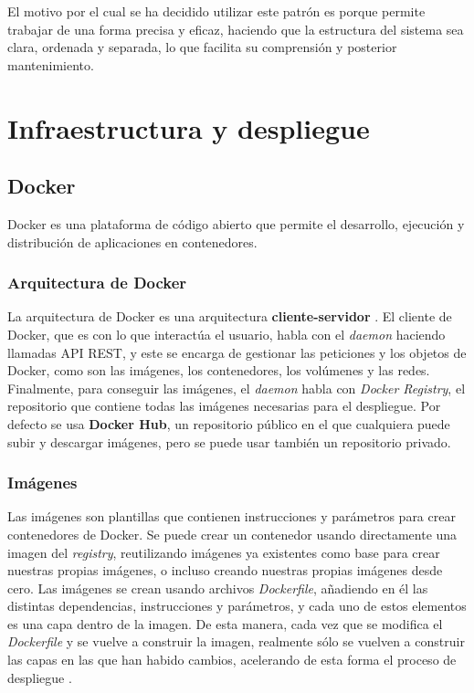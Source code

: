 
El motivo por el cual se ha decidido utilizar este patrón es porque permite trabajar de una forma precisa y eficaz, haciendo que la estructura del sistema sea clara, ordenada y separada, lo que facilita su comprensión y posterior mantenimiento.  


\section{Infraestructura y despliegue}
 
\subsection{Docker}

Docker es una plataforma de código abierto que permite el desarrollo, ejecución y distribución de aplicaciones en contenedores.

\subsubsection{Arquitectura de Docker}

La arquitectura de Docker es una arquitectura \textbf{cliente-servidor} \cite{docker:overview-architecture}. El cliente de Docker, que es con lo que interactúa el usuario, habla con el \textit{daemon} haciendo llamadas API REST, y este se encarga de gestionar las peticiones y los objetos de Docker, como son las imágenes, los contenedores, los volúmenes y las redes. Finalmente, para conseguir las imágenes, el \textit{daemon} habla con \textit{Docker Registry}, el repositorio que contiene todas las imágenes necesarias para el despliegue. Por defecto se usa \textbf{Docker Hub}, un repositorio público en el que cualquiera puede subir y descargar imágenes, pero se puede usar también un repositorio privado.


\subsubsection{Imágenes}

Las imágenes son plantillas que contienen instrucciones y parámetros para crear contenedores de Docker. Se puede crear un contenedor usando directamente una imagen del \textit{registry}, reutilizando imágenes ya existentes como base para crear nuestras propias imágenes, o incluso creando nuestras propias imágenes desde cero. Las imágenes se crean usando archivos \textit{Dockerfile}, añadiendo en él las distintas dependencias, instrucciones y parámetros, y cada uno de estos elementos es una capa dentro de la imagen. De esta manera, cada vez que se modifica el \textit{Dockerfile} y se vuelve a construir la imagen, realmente sólo se vuelven a construir las capas en las que han habido cambios, acelerando de esta forma el proceso de despliegue \cite{docker:overview-objects}.

